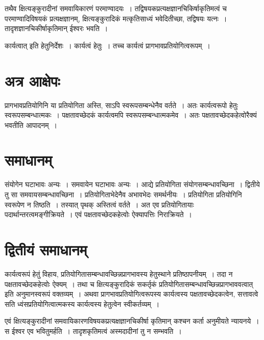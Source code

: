 {तथैव क्षित्यङ्कुरादीनां समवायिकारणं परमाण्वादयः~। तद्विषयकप्रत्यक्षज्ञानचिकिर्षाकृतिमत्वं च परमाण्वादिविषयकं प्रत्यक्षज्ञानम्, क्षित्यङ्कुरादिकं मत्कृतिसाध्यं भवेदितीच्छा, तद्विषयः यत्नः~। तादृशज्ञानचिकीर्षाकृतिमान् ईश्वरः भवति~। 

कार्यत्वात् इति हेतुनिर्देशः~। कार्यत्वं हेतुः~। तच्च कार्यत्वं प्रागभावप्रतियोगित्वरूपम्~। 

\section*{अत्र आक्षेपः} 

प्रागभावप्रतियोगिनि या प्रतियोगिता अस्ति, साऽपि स्वरूपसम्बन्धेनैव वर्तते~। अतः कार्यत्वरूपो हेतुः स्वरूपसम्बन्धात्मकः~। पक्षतावच्छेदकं कार्यत्वमपि स्वरूपसम्बन्धात्मकमेव~। अतः पक्षतावच्छेदकहेत्वोरैक्यं भवतीति आपादनम्~। 

\section*{समाधानम्} 

संयोगेन घटाभावः अन्यः~। समवायेन घटाभावः अन्यः~। आद्ये प्रतियोगिता संयोगसम्बन्धावच्छिना~। द्वितीये तु सा समवायसम्बन्धावच्छिना~। प्रतियोगिताभेदेनैव अभावभेदः समर्थनीयः~। प्रतियोगिता प्रतियोगिनि स्वरूपेण न तिष्ठति~। तस्यात् पृथक् अस्तित्वं वर्तते~। अत एव प्रतियोगितायाः पदार्थान्तरत्वमङ्गीक्रियते~। एवं पक्षतावच्छेदकहेत्वोः ऐक्यापत्तिः निराक्रियते~। 

\section*{द्वितीयं समाधानम्} 

कार्यत्वरूपं हेतुं विहाय, प्रतियोगितासम्बन्धावच्छिन्नप्रागभावस्य हेतुस्थाने प्रतिष्ठापनीयम्~। तदा न पक्षतावच्छेदकहेत्वोः ऐक्यम्~। तथा च क्षित्यङ्कुरादिकं सकर्तृकं प्रतियोगितासम्बन्धावच्छिन्नप्रागभाववत्वात् इति अनुमानस्वरूपं वक्तव्यम्~। अथवा प्रागभावप्रतियोगित्वरूपस्य कार्यत्वस्य पक्षतावच्छेदकत्वेन, सत्तावत्वे सति ध्वंसप्रतियोगित्वात्मकस्य कार्यत्वस्य हेतुत्वेन स्वीकर्तव्यम्~। 

एवं क्षित्यङ्कुरादीनां समवायिकारणविषयकप्रत्यक्षज्ञानचिकीर्षा कृतिमान् कश्चन कर्ता अनुमीयते न्यायनये~। स ईश्वर एव भवितुमर्हति~। तादृशकृतिमत्वं अस्मदादीनां तु न सम्भवति~। 

\articleend
}
